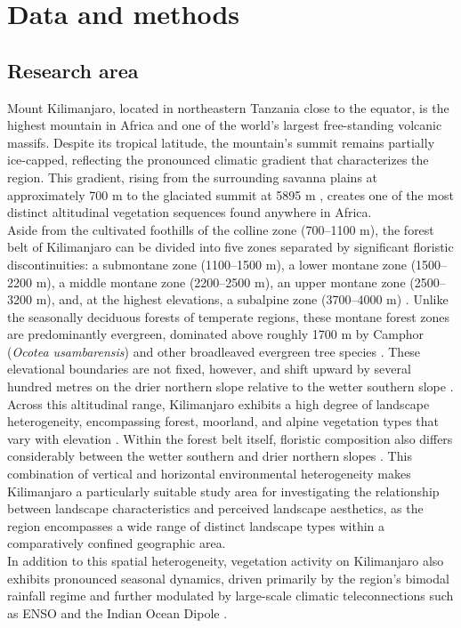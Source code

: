 \documentclass[hidelinks, 11pt]{article}
\begin{document}
\section{Data and methods}\label{sec:Data and Methods}
\subsection{Research area}

Mount Kilimanjaro, located in northeastern Tanzania close to the equator,
is the highest mountain in Africa and one of the world's largest
free-standing volcanic massifs. Despite its tropical latitude, the
mountain's summit remains partially ice-capped, reflecting the pronounced
climatic gradient that characterizes the region. This gradient, rising from
the surrounding savanna plains at approximately 700 m to the glaciated
summit at 5895 m \citep{hemp_continuum_2006}, creates one of the most
distinct altitudinal vegetation sequences found anywhere in Africa.
\\
Aside from the cultivated foothills of the colline zone (700--1100 m), the
forest belt of Kilimanjaro can be divided into five zones separated by
significant floristic discontinuities: a submontane zone (1100--1500 m), a
lower montane zone (1500--2200 m), a middle montane zone (2200--2500 m), an
upper montane zone (2500--3200 m), and, at the highest elevations, a
subalpine zone (3700--4000 m) \citep{hemp_continuum_2006}. Unlike the
seasonally deciduous forests of temperate regions, these montane forest
zones are predominantly evergreen, dominated above roughly 1700 m by
Camphor (\textit{Ocotea usambarensis}) and other broadleaved evergreen tree
species \citep{bussmann2006vegetation}. These elevational boundaries are
not fixed, however, and shift upward by several hundred metres on the
drier northern slope relative to the wetter southern slope
\citep{hemp_continuum_2006}.
\\
Across this altitudinal range, Kilimanjaro exhibits a high degree of
landscape heterogeneity, encompassing forest, moorland, and alpine
vegetation types that vary with elevation \citep{hemp_continuum_2006,
bussmann2006vegetation}. Within the forest belt itself, floristic
composition also differs considerably between the wetter southern and
drier northern slopes \citep{hemp_continuum_2006}. This combination of
vertical and horizontal environmental heterogeneity makes Kilimanjaro a
particularly suitable study area for investigating the relationship
between landscape characteristics and perceived landscape aesthetics, as
the region encompasses a wide range of distinct landscape types within a
comparatively confined geographic area.
\\
In addition to this spatial heterogeneity, vegetation activity on
Kilimanjaro also exhibits pronounced seasonal dynamics, driven primarily by
the region's bimodal rainfall regime and further modulated by large-scale
climatic teleconnections such as ENSO and the Indian Ocean Dipole
\citep{detsch2016seasonal}.
\end{document}

